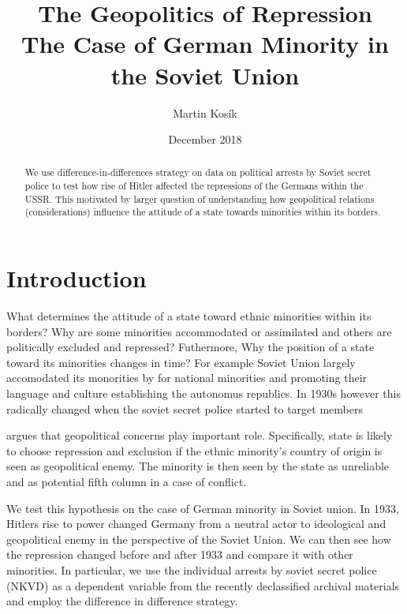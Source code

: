 \documentclass[11pt]{article}
\title{The Geopolitics of Repression \\
  \large The Case of German Minority in the Soviet Union}
\author{Martin Kosík}
\date{December 2018}
\begin{document}
\maketitle

\begin{abstract}
    We use difference-in-differences strategy on data on political arrests by Soviet secret police to test how rise of Hitler affected the repressions of the Germans within the USSR. This motivated by larger question of understanding how geopolitical relations (considerations) influence the attitude of a state towards minorities within its borders. 
\end{abstract}

\section{Introduction}
What determines the attitude of a state toward ethnic minorities within its borders? Why are some minorities accommodated or assimilated and others are politically excluded and repressed? Futhermore,  Why the position of a state toward its minorities changes in time? For example Soviet Union largely accomodated its monorities by  for national minorities and promoting their language and culture establishing the autonomus republics. In 1930s however this radically changed when the soviet secret police started to target members

\citet{mylonas_politics_2013} argues that geopolitical concerns play important role. Specifically, state is likely to choose repression and exclusion if the ethnic minority's country of origin is seen as geopolitical enemy. The minority is then seen by the state as unreliable and  as potential fifth column in a case of conflict.  

We test this hypothesis on the case of German minority in Soviet union.
In 1933, Hitlers rise to power changed Germany from a neutral actor to ideological and geopolitical enemy in the perspective of the Soviet Union. We can then see how the repression changed before and after 1933 and compare it with other minorities. In particular, we use the individual arrests by soviet secret police (NKVD) as a dependent variable from the recently declassified archival materials and employ the difference in difference strategy. 
\end{document}
